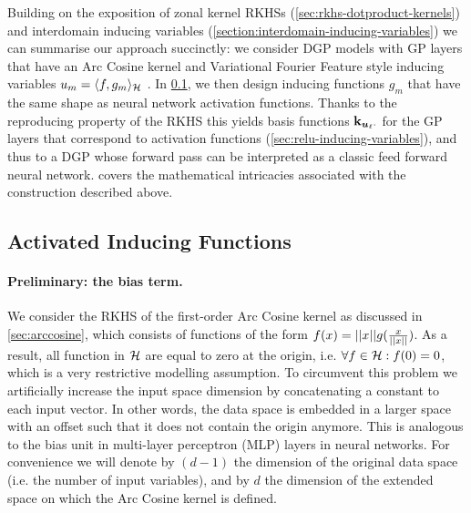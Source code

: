 Building on the exposition of zonal kernel RKHSs (\cref{sec:rkhs-dotproduct-kernels}) and interdomain inducing variables (\cref{section:interdomain-inducing-variables}) we can summarise our approach succinctly: we consider DGP models with GP layers that have an Arc Cosine kernel and Variational Fourier Feature style inducing variables $u_m = \langle f, {g}_m \rangle_{{\mathcal{H}}}$ \citep{hensman2017variational}. In \cref{sec:inducing-function}, we then design inducing functions $g_m$ that have the same shape as neural network activation functions. Thanks to the reproducing property of the RKHS this yields basis functions $\mathbf{k}_{\bm{u}_\ell \cdot}$ for the GP layers that correspond to activation functions (\cref{sec:relu-inducing-variables}), and thus to a DGP whose forward pass can be interpreted as a classic feed forward neural network.  covers the mathematical intricacies associated with the construction described above.

\subsection{Activated Inducing Functions}
\label{sec:inducing-function}

\paragraph{Preliminary: the bias term.}
We consider the RKHS of the first-order Arc Cosine kernel as discussed in \cref{sec:arccosine}, which consists of functions of the form $f(x) = \lvert\lvert x\rvert\rvert g({x \over \lvert\lvert x\rvert\rvert})$. As a result, all function in ${\mathcal{H}}$ are equal to zero at the origin, i.e. $\forall f \in {\mathcal{H}}: f({0}) = 0$, which is a very restrictive modelling assumption. To circumvent this problem we artificially increase the input space dimension by concatenating a constant to each input vector. In other words, the data space is embedded in a larger space with an offset such that it does not contain the origin anymore. This is analogous to the bias unit in multi-layer perceptron (MLP) layers in neural networks. For convenience we will denote by $(d-1)$ the dimension of the original data space (i.e. the number of input variables), and by $d$ the dimension of the extended space on which the Arc Cosine kernel is defined.

